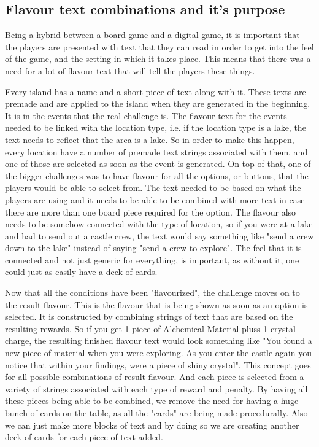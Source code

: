 \subsection{Flavour text combinations and it's purpose}
Being a hybrid between a board game and a digital game, it is important that the players are presented with text that they can read in order to get into the feel of the game, and the setting in which it takes place. This means that there was a need for a lot of flavour text that will tell the players these things. 

Every island has a name and a short piece of text along with it. These texts are premade and are applied to the island when they are generated in the beginning. 
It is in the events that the real challenge is. The flavour text for the events needed to be linked with the location type, i.e. if the location type is a lake, the text needs to reflect that the area is a lake. So in order to make this happen, every location have a number of premade text strings associated with them, and one of those are selected as soon as the event is generated. On top of that, one of the bigger challenges was to have flavour for all the options, or buttons, that the players would be able to select from. The text needed to be based on what the players are using and it needs to be able to be combined with more text in case there are more than one board piece required for the option. The flavour also needs to be somehow connected with the type of location, so if you were at a lake and had to send out a castle crew, the text would say something like "send a crew down to the lake" instead of saying "send a crew to explore". The feel that it is connected and not just generic for everything, is important, as without it, one could just as easily have a deck of cards. 

Now that all the conditions have been "flavourized", the challenge moves on to the result flavour. This is the flavour that is being shown as soon as an option is selected. It is constructed by combining strings of text that are based on the resulting rewards. So if you get 1 piece of Alchemical Material pluss 1 crystal charge, the resulting finished flavour text would look something like "You found a new piece of material when you were exploring. As you enter the castle again you notice that within your findings, were a piece of shiny crystal". 
This concept goes for all possible combinations of result flavour. And each piece is selected from a variety of strings associated with each type of reward and penalty. By having all these pieces being able to be combined, we remove the need for having a huge bunch of cards on the table, as all the "cards" are being made procedurally. Also we can just make more blocks of text and by doing so we are creating another deck of cards for each piece of text added.


